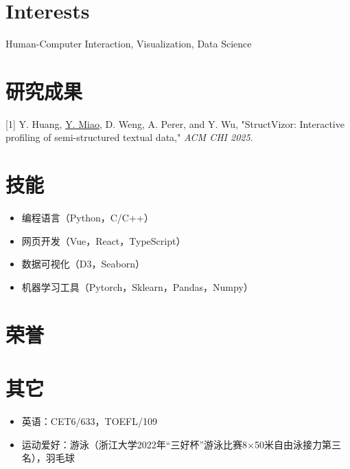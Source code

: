 \documentclass{resume}
\begin{document}
\section{Interests}
Human-Computer Interaction, Visualization, Data Science

\section{研究成果}
{[1] Y. Huang, \uline{Y. Miao}, D. Weng, A. Perer, and Y. Wu, "StructVizor: Interactive profiling of
semi-structured textual data," \textit{ACM CHI 2025}.}


\section{技能}
\begin{itemize}[parsep=0.5ex]
    \item 编程语言（Python，C/C++）
    \item 网页开发（Vue，React，TypeScript）
    \item 数据可视化（D3，Seaborn）
    \item 机器学习工具（Pytorch，Sklearn，Pandas，Numpy）
\end{itemize}

\section{荣誉}

\section{其它}
\begin{itemize}[parsep=0.5ex]
  \item 英语：CET6/633，TOEFL/109
  \item 运动爱好：游泳（浙江大学2022年“三好杯”游泳比赛8×50米自由泳接力第三名），羽毛球
\end{itemize}

%
%
\end{document}
